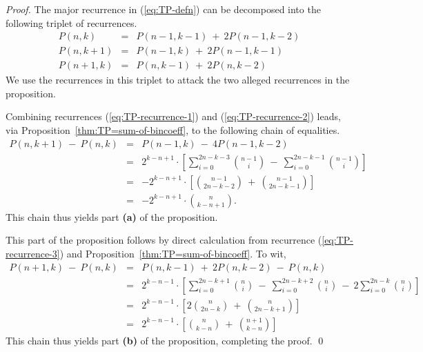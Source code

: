 \begin{proof}
The major recurrence in (\ref{eq:TP-defn}) can be decomposed into the
following triplet of recurrences.
\begin{eqnarray}
\label{eq:TP-recurrence-1}
P(n, k)   & = & P(n-1, k-1) \ + \ 2 P(n-1, k-2) \\
\label{eq:TP-recurrence-2}
P(n, k+1) & = & P(n-1, k) \ + \ 2 P(n-1, k-1) \\
\label{eq:TP-recurrence-3}
P(n+1, k) & = & P(n, k-1) \ + \ 2 P(n, k-2)
\end{eqnarray}
We use the recurrences in this triplet to attack the two alleged
recurrences in the proposition.

\medskip

Combining recurrences (\ref{eq:TP-recurrence-1}) and
(\ref{eq:TP-recurrence-2}) leads, via
Proposition~\ref{thm:TP=sum-of-bincoeff}, to the following chain of
equalities.
\begin{eqnarray*}
P(n, k+1) \ - \ P(n, k)
  & = &
P(n-1, k) \ - \ 4 P(n-1, k-2) \\
  & = &
2^{k-n+1} \cdot \left[
\sum_{i=0}^{2n-k-3} {{n-1} \choose i} \ - \
\sum_{i=0}^{2n-k-1} {{n-1} \choose i}
\right] \\
  & = & 
- 2^{k-n+1} \cdot \left[
{{n-1} \choose {2n-k-2}} \ + \ {{n-1} \choose {2n-k-1}}
\right] \\
  & = &
- 2^{k-n+1} \cdot {n \choose k-n+1}.
\end{eqnarray*}
This chain thus yields part {\bf (a)} of the proposition.

\medskip

This part of the proposition follows by direct calculation from
recurrence (\ref{eq:TP-recurrence-3}) and
Proposition~\ref{thm:TP=sum-of-bincoeff}.  To wit,
\begin{eqnarray*}
P(n+1, k) \ - \ P(n, k)
  & = &
P(n, k-1) \ + \ 2 P(n, k-2) \ - \ P(n,k) \\
  & = &
2^{k-n-1} \cdot \left[
\sum_{i=0}^{2n-k+1} {n \choose i}
 \ - \ \sum_{i=0}^{2n-k+2} {n \choose i}
 \ - \ 2 \sum_{i=0}^{2n-k} {n \choose i}
\right] \\
  & = & 
2^{k-n-1} \cdot \left[
  2 {n \choose {2n-k}} \ + \ {n \choose {2n-k+1}} \right] \\
  & = &
2^{k-n-1} \cdot \left[
   {n \choose {k-n}} \ + \ {{n+1} \choose {k-n}} \right]
\end{eqnarray*}
This chain thus yields part {\bf (b)} of the proposition, completing
the proof.
\qed
\end{proof}

